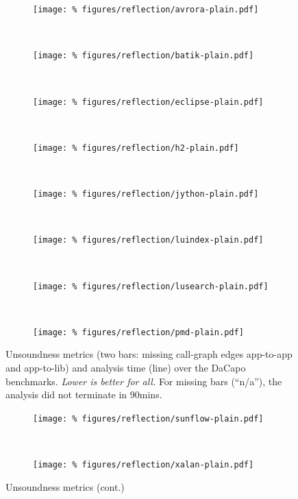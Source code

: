 \begin{figure}
  \begin{subfigure}[t]{0.5\textwidth}
    \centering
    \texttt{[image: \%
      figures/reflection/avrora-plain.pdf]}
  \end{subfigure}
  ~
  \begin{subfigure}[t]{0.5\textwidth}
    \centering
    \texttt{[image: \%
      figures/reflection/batik-plain.pdf]}
  \end{subfigure}
  \\

  \begin{subfigure}[t]{0.5\textwidth}
    \centering
    \texttt{[image: \%
      figures/reflection/eclipse-plain.pdf]}
  \end{subfigure}
  ~
  \begin{subfigure}[t]{0.5\textwidth}
    \centering
    \texttt{[image: \%
      figures/reflection/h2-plain.pdf]}
  \end{subfigure}
  \\

  \begin{subfigure}[t]{0.5\textwidth}
    \centering
    \texttt{[image: \%
      figures/reflection/jython-plain.pdf]}
  \end{subfigure}
  ~
  \begin{subfigure}[t]{0.5\textwidth}
    \centering
    \texttt{[image: \%
      figures/reflection/luindex-plain.pdf]}
  \end{subfigure}
  \\

  \begin{subfigure}[t]{0.5\textwidth}
    \centering
    \texttt{[image: \%
      figures/reflection/lusearch-plain.pdf]}
  \end{subfigure}
  ~
  \begin{subfigure}[t]{0.5\textwidth}
    \centering
    \texttt{[image: \%
      figures/reflection/pmd-plain.pdf]}
  \end{subfigure}
  \caption[Unsoundness metrics]{%
    Unsoundness metrics (two bars: missing call-graph edges app-to-app
    and app-to-lib) and analysis time (line) over the DaCapo
    benchmarks. \emph{Lower is better for all.} For missing bars
    (``n/a''), the analysis did not terminate in 90mins.}
\end{figure}
\begin{figure}\ContinuedFloat
  \begin{subfigure}[t]{0.5\textwidth}
    \centering
    \texttt{[image: \%
      figures/reflection/sunflow-plain.pdf]}
  \end{subfigure}
  ~
  \begin{subfigure}[t]{0.5\textwidth}
    \centering
    \texttt{[image: \%
      figures/reflection/xalan-plain.pdf]}
  \end{subfigure}



  \caption{Unsoundness metrics (cont.)}
  \label{reflection/fig:dacapo-bach}
\end{figure}

